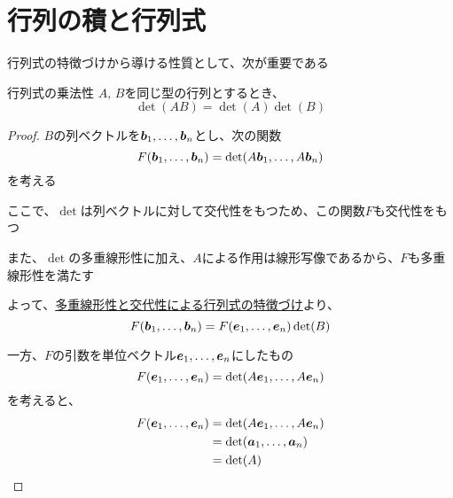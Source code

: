 \documentclass[../../../topic_linear-algebra]{subfiles}
\begin{document}
\sectionline
\section{行列の積と行列式}

行列式の特徴づけから導ける性質として、次が重要である

\begin{theorem}{行列式の乗法性}
  $A,\,B$を同じ型の行列とするとき、
  \begin{equation*}
    \det(AB) = \det(A) \det(B)
  \end{equation*}
\end{theorem}

\begin{proof}
  $B$の列ベクトルを$\vb*{b}_1, \ldots, \vb*{b}_n$とし、次の関数
  \begin{equation*}
    F(\vb*{b}_1, \ldots, \vb*{b}_n) = \det(A\vb*{b}_1, \ldots, A\vb*{b}_n)
  \end{equation*}
  を考える

  ここで、$\det$は列ベクトルに対して交代性をもつため、この関数$F$も交代性をもつ

  また、$\det$の多重線形性に加え、$A$による作用は線形写像であるから、$F$も多重線形性を満たす

  \br

  よって、\hyperref[thm:determinant-characterization-by-properties]{多重線形性と交代性による行列式の特徴づけ}より、
  \begin{equation*}
    F(\vb*{b}_1, \ldots, \vb*{b}_n) = F(\vb*{e}_1, \ldots, \vb*{e}_n) \det(B)
  \end{equation*}

  \br

  一方、$F$の引数を単位ベクトル$\vb*{e}_1, \ldots, \vb*{e}_n$にしたもの
  \begin{equation*}
    F(\vb*{e}_1, \ldots, \vb*{e}_n) = \det(A\vb*{e}_1, \ldots, A\vb*{e}_n)
  \end{equation*}
  を考えると、
  \begin{align*}
    F(\vb*{e}_1, \ldots, \vb*{e}_n) & = \det(A\vb*{e}_1, \ldots, A\vb*{e}_n) \\
                                    & = \det(\vb*{a}_1, \ldots, \vb*{a}_n)   \\
                                    & = \det(A)
  \end{align*}

  \br


\end{proof}
\end{document}
